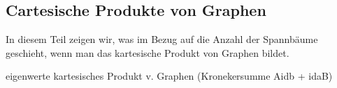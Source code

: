 \graphicspath{{grafiken/}}

\subsection{Cartesische Produkte von Graphen}
In diesem Teil zeigen wir, was im Bezug auf die Anzahl der Spannbäume geschieht, wenn man das kartesische Produkt von Graphen bildet. %
\begin{Lm}
eigenwerte kartesisches Produkt v. Graphen (Kronekersumme Aidb + idaB)
\end{Lm}
